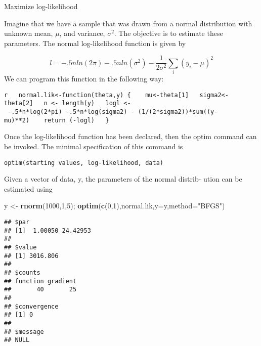 \documentclass[8pt,ignorenonframetext,]{beamer}
\newenvironment{Shaded}{\begin{snugshade}}{\end{snugshade}}
\newcommand{\KeywordTok}[1]{\textcolor[rgb]{0.13,0.29,0.53}{\textbf{#1}}}
\newcommand{\DataTypeTok}[1]{\textcolor[rgb]{0.13,0.29,0.53}{#1}}
\newcommand{\DecValTok}[1]{\textcolor[rgb]{0.00,0.00,0.81}{#1}}
\newcommand{\StringTok}[1]{\textcolor[rgb]{0.31,0.60,0.02}{#1}}
\newcommand{\NormalTok}[1]{#1}
\begin{document}
\begin{frame}[fragile]{Maximize log-likelihood}

Imagine that we have a sample that was drawn from a normal distribution
with unknown mean, \(\mu\), and variance, \(\sigma^2\). The objective is
to estimate these parameters. The normal log-likelihood function is
given by

\[ l = −.5 n ln (2\pi)−.5 n ln(\sigma^2)− \frac{1}{2\sigma^2} \sum_{i} (y_i -\mu)^2 \]
We can program this function in the following way:

\texttt{r\ \ \ normal.lik\textless{}-function(theta,y)\ \{\ \ \ \ mu\textless{}-theta{[}1{]}\ \ \ sigma2\textless{}-theta{[}2{]}\ \ \ n\ \textless{}-\ length(y)\ \ \ logl\ \textless{}-\ -.5*n*log(2*pi)\ -.5*n*log(sigma2)\ -\ (1/(2*sigma2))*sum((y-mu)**2)\ \ \ \ return\ (-logl)\ \ \ \}}

\end{frame}

\begin{frame}[fragile]

Once the log-likelihood function has been declared, then the optim
command can be invoked. The minimal specification of this command is

\texttt{optim(starting\ values,\ log-likelihood,\ data)}

Given a vector of data, y, the parameters of the normal distrib- ution
can be estimated using

\begin{Shaded}
\begin{Highlighting}[]
\NormalTok{y <-}\StringTok{ }\KeywordTok{rnorm}\NormalTok{(}\DecValTok{1000}\NormalTok{,}\DecValTok{1}\NormalTok{,}\DecValTok{5}\NormalTok{);}
\KeywordTok{optim}\NormalTok{(}\KeywordTok{c}\NormalTok{(}\DecValTok{0}\NormalTok{,}\DecValTok{1}\NormalTok{),normal.lik,}\DataTypeTok{y=}\NormalTok{y,}\DataTypeTok{method=}\StringTok{"BFGS"}\NormalTok{)}
\end{Highlighting}
\end{Shaded}

\begin{verbatim}
## $par
## [1]  1.00050 24.42953
## 
## $value
## [1] 3016.806
## 
## $counts
## function gradient 
##       40       25 
## 
## $convergence
## [1] 0
## 
## $message
## NULL
\end{verbatim}

\end{frame}
\end{document}
